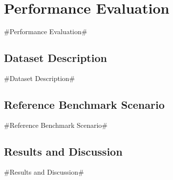 \section{Performance Evaluation}

\#Performance Evaluation\#

\subsection{Dataset Description}

\#Dataset Description\#

\subsection{Reference Benchmark Scenario}

\#Reference Benchmark Scenario\#

\subsection{Results and Discussion}

\#Results and Discussion\#